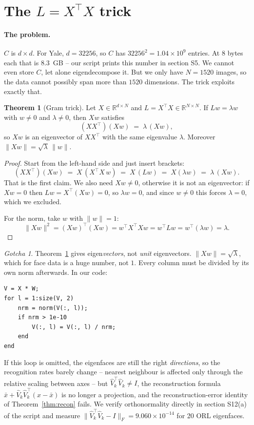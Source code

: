 \documentclass[11pt]{article}
\theoremstyle{definition}
\newtheorem{theorem}{Theorem}[section]
\theoremstyle{remark}
\newtheorem*{gotcha}{Gotcha}
\newcommand{\R}{\mathbb{R}}
\begin{document}
\section{The \texorpdfstring{$L=X^{\!\top}\!X$}{L = X'X} trick}\label{sec:gram}

\paragraph{The problem.} $C$ is $d\times d$. For Yale, $d=32256$, so $C$ has
$32256^2 = 1.04\times 10^9$ entries. At 8 bytes each that is $\mathbf{8.3}$~GB --
our script prints this number in section S5. We cannot even store $C$, let alone
eigendecompose it. But we only have $N=1520$ images, so the data cannot possibly
span more than $1520$ dimensions. The trick exploits exactly that.

\begin{theorem}[Gram trick]\label{thm:gram}
Let $X\in\R^{d\times N}$ and $L = X^{\!\top}\!X \in \R^{N\times N}$.
If $Lw=\lambda w$ with $w \neq 0$ and $\lambda \neq 0$, then $Xw$ satisfies
\[
  (XX^{\!\top})(Xw) \;=\; \lambda\,(Xw) ,
\]
so $Xw$ is an eigenvector of $XX^{\!\top}$ with the same eigenvalue $\lambda$.
Moreover $\|Xw\| = \sqrt{\lambda}\,\|w\|$.
\end{theorem}

\begin{proof}
Start from the left-hand side and just insert brackets:
\[
  (XX^{\!\top})(Xw) \;=\; X\,(X^{\!\top}\!X\,w) \;=\; X\,(Lw) \;=\; X(\lambda w) \;=\; \lambda\,(Xw).
\]
That is the first claim. We also need $Xw\neq 0$, otherwise it is not an
eigenvector: if $Xw=0$ then $Lw = X^{\!\top}(Xw) = 0$, so $\lambda w = 0$, and since
$w\neq0$ this forces $\lambda=0$, which we excluded.

For the norm, take $w$ with $\|w\|=1$:
\[
  \|Xw\|^2 = (Xw)^{\!\top}(Xw) = w^{\!\top} X^{\!\top}\!X w = w^{\!\top} L w = w^{\!\top}(\lambda w) = \lambda .
\]
\end{proof}

\begin{gotcha}
Theorem~\ref{thm:gram} gives eigen\emph{vectors}, not \emph{unit} eigenvectors.
$\|Xw\| = \sqrt{\lambda}$, which for face data is a huge number, not $1$. Every
column must be divided by its own norm afterwards. In our code:
\begin{lstlisting}
V = X * W;
for l = 1:size(V, 2)
    nrm = norm(V(:, l));
    if nrm > 1e-10
        V(:, l) = V(:, l) / nrm;
    end
end
\end{lstlisting}
If this loop is omitted, the eigenfaces are still the right \emph{directions}, so
the recognition rates barely change -- nearest neighbour is affected only through
the relative scaling between axes -- but $\hat{V}_k^{\!\top}\hat{V}_k \ne I$, the reconstruction
formula $\bar{x} + \hat{V}_k\hat{V}_k^{\!\top}(x-\bar{x})$ is no longer a projection, and the
reconstruction-error identity of Theorem~\ref{thm:recon} fails. We verify
orthonormality directly in section S12(a) of the script and measure
$\|\hat{V}_k^{\!\top}\hat{V}_k - I\|_F = 9.060\times 10^{-14}$ for 20 ORL eigenfaces.
\end{gotcha}
\end{document}
